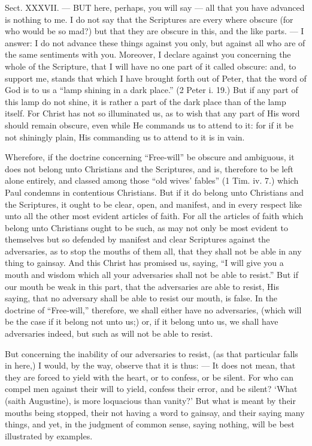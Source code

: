 
Sect. XXXVII. — BUT here, perhaps, you will say — all that you have advanced is nothing to me. I do not say that the Scriptures are every where obscure (for who would be so mad?) but that they are obscure in this, and the like parts. — I answer: I do not advance these things against you only, but against all who are of the same sentiments with you. Moreover, I declare against you concerning the whole of the Scripture, that I will have no one part of it called obscure: and, to support me, stands that which I have brought forth out of Peter, that the word of God is to us a “lamp shining in a dark place.” (2 Peter i. 19.) But if any part of this lamp do not shine, it is rather a part of the dark place than of the lamp itself. For Christ has not so illuminated us, as to wish that any part of His word should remain obscure, even while He commands us to attend to it: for if it be not shiningly plain, His commanding us to attend to it is in vain.

Wherefore, if the doctrine concerning “Free-will” be obscure and ambiguous, it does not belong unto Christians and the Scriptures, and is, therefore to be left alone entirely, and classed among those “old wives’ fables” (1 Tim. iv. 7.) which Paul condemns in contentious Christians. But if it do belong unto Christians and the Scriptures, it ought to be clear, open, and manifest, and in every respect like unto all the other most evident articles of faith. For all the articles of faith which belong unto Christians ought to be such, as may not only be most evident to themselves but so defended by manifest and clear Scriptures against the adversaries, as to stop the mouths of them all, that they shall not be able in any thing to gainsay. And this Christ has promised us, saying, “I will give you a mouth and wisdom which all your adversaries shall not be able to resist.” But if our mouth be weak in this part, that the adversaries are able to resist, His saying, that no adversary shall be able to resist our mouth, is false. In the doctrine of “Free-will,” therefore, we shall either have no adversaries, (which will be the case if it belong not unto us;) or, if it belong unto us, we shall have adversaries indeed, but such as will not be able to resist.

But concerning the inability of our adversaries to resist, (as that particular falls in here,) I would, by the way, observe that it is thus: — It does not mean, that they are forced to yield with the heart, or to confess, or be silent. For who can compel men against their will to yield, confess their error, and be silent? ‘What (saith Augustine), is more loquacious than vanity?’ But what is meant by their mouths being stopped, their not having a word to gainsay, and their saying many things, and yet, in the judgment of common sense, saying nothing, will be best illustrated by examples.

